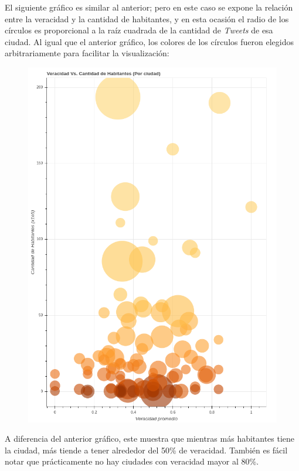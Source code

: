 \documentclass[titlepage,a4paper]{article}
\begin{document}
    El siguiente gráfico es similar al anterior; pero en este caso se expone la relación entre la veracidad y la cantidad de habitantes, y en esta ocasión el radio de los círculos es proporcional a la raíz cuadrada de la cantidad de \textit{Tweets} de esa ciudad. Al igual que el anterior gráfico, los colores de los círculos fueron elegidos arbitrariamente para facilitar la visualización:
    
    \begin{figure}[H]
    \centering
    \includegraphics[width=1\textwidth]{graficos/Analisis de Locacion/veracidad_vs_cantidad_de_habitantes_por_ciudad.png}
    \caption{}
    \end{figure}
    
    A diferencia del anterior gráfico, este muestra que mientras más habitantes tiene la ciudad, más tiende a tener alrededor del 50\% de veracidad. También es fácil notar que prácticamente no hay ciudades con veracidad mayor al 80\%.
\end{document}
